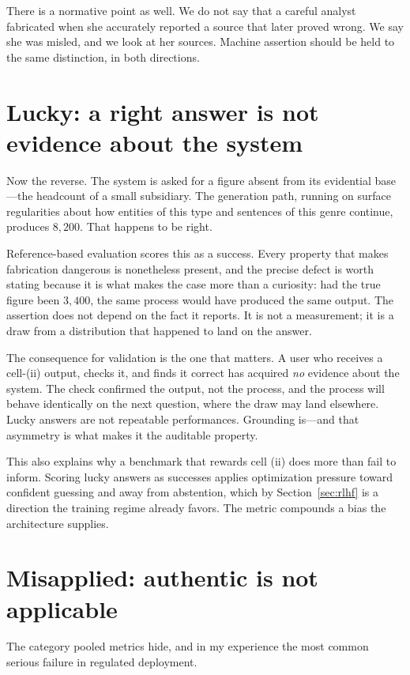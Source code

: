There is a normative point as well. We do not say that a careful analyst
fabricated when she accurately reported a source that later proved wrong. We say
she was misled, and we look at her sources. Machine assertion should be held to the
same distinction, in both directions.

\section{Lucky: a right answer is not evidence about the system}
\label{sec:cell-ii}

Now the reverse. The system is asked for a figure absent from its evidential
base---the headcount of a small subsidiary. The generation path, running on surface
regularities about how entities of this type and sentences of this genre continue,
produces $8{,}200$. That happens to be right.

Reference-based evaluation scores this as a success. Every property that makes
fabrication dangerous is nonetheless present, and the precise defect is worth
stating because it is what makes the case more than a curiosity: had the true
figure been $3{,}400$, the same process would have produced the same output. The
assertion does not depend on the fact it reports. It is not a measurement; it is a
draw from a distribution that happened to land on the answer.

The consequence for validation is the one that matters. A user who receives a
cell-(ii) output, checks it, and finds it correct has acquired \emph{no} evidence
about the system. The check confirmed the output, not the process, and the process
will behave identically on the next question, where the draw may land elsewhere.
Lucky answers are not repeatable performances. Grounding is---and that asymmetry
is what makes it the auditable property.

This also explains why a benchmark that rewards cell (ii) does more than fail to
inform. Scoring lucky answers as successes applies
optimization pressure toward confident guessing and away from abstention, which by
Section~\ref{sec:rlhf} is a direction the training regime already favors. The
metric compounds a bias the architecture supplies.

\section{Misapplied: authentic is not applicable}
\label{sec:cell-v}

The category pooled metrics hide, and in my experience the most common serious
failure in regulated deployment.

